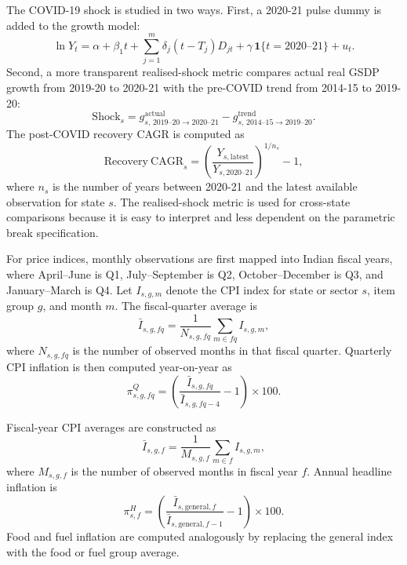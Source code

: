 \documentclass[11pt,a4paper]{article}
\begin{document}
The COVID-19 shock is studied in two ways. First, a 2020-21 pulse dummy is added to the growth model:
\begin{equation}
\ln Y_t = \alpha + \beta_1 t + \sum_{j=1}^{m}\delta_j(t-T_j)D_{jt} + \gamma \,\mathbf{1}\{t=2020\text{--}21\} + u_t.
\end{equation}
Second, a more transparent realised-shock metric compares actual real GSDP growth from 2019-20 to 2020-21 with the pre-COVID trend from 2014-15 to 2019-20:
\begin{equation}
\mathrm{Shock}_s = g^{\mathrm{actual}}_{s,\,2019\text{--}20 \rightarrow 2020\text{--}21} - g^{\mathrm{trend}}_{s,\,2014\text{--}15 \rightarrow 2019\text{--}20}.
\end{equation}
The post-COVID recovery CAGR is computed as
\begin{equation}
\mathrm{Recovery\ CAGR}_s = \left(\frac{Y_{s,\mathrm{latest}}}{Y_{s,2020\text{--}21}}\right)^{1/n_s}-1,
\end{equation}
where $n_s$ is the number of years between 2020-21 and the latest available observation for state $s$. The realised-shock metric is used for cross-state comparisons because it is easy to interpret and less dependent on the parametric break specification.

For price indices, monthly observations are first mapped into Indian fiscal years, where April--June is Q1, July--September is Q2, October--December is Q3, and January--March is Q4. Let $I_{s,g,m}$ denote the CPI index for state or sector $s$, item group $g$, and month $m$. The fiscal-quarter average is
\begin{equation}
\bar I_{s,g,fq} = \frac{1}{N_{s,g,fq}}\sum_{m \in fq} I_{s,g,m},
\end{equation}
where $N_{s,g,fq}$ is the number of observed months in that fiscal quarter. Quarterly CPI inflation is then computed year-on-year as
\begin{equation}
\pi^{Q}_{s,g,fq} = \left(\frac{\bar I_{s,g,fq}}{\bar I_{s,g,fq-4}} - 1\right)\times 100.
\end{equation}

Fiscal-year CPI averages are constructed as
\begin{equation}
\bar I_{s,g,f} = \frac{1}{M_{s,g,f}}\sum_{m \in f} I_{s,g,m},
\end{equation}
where $M_{s,g,f}$ is the number of observed months in fiscal year $f$. Annual headline inflation is
\begin{equation}
\pi^{H}_{s,f} = \left(\frac{\bar I_{s,\mathrm{general},f}}{\bar I_{s,\mathrm{general},f-1}} - 1\right)\times 100.
\end{equation}
Food and fuel inflation are computed analogously by replacing the general index with the food or fuel group average.
\end{document}
